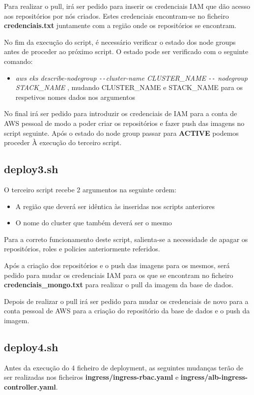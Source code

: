 \documentclass[11pt,a4paper]{article}
\begin{document}
Para realizar o pull, irá ser pedido para inserir os credenciais IAM que dão acesso aos repositórios por nós criados. Estes credenciais encontram-se no ficheiro \textbf{credenciais.txt} juntamente com a região onde os repositórios se encontram.

No fim da execução do script, é necessário verificar o estado dos node groups antes de proceder ao próximo script. O estado pode ser verificado com o seguinte comando: 
\begin{itemize}
	\item \textit{aws eks describe-nodegroup \texttt{-{}-}cluster-name CLUSTER\_NAME \texttt{-{}-} nodegroup STACK\_NAME} , mudando CLUSTER\_NAME e STACK\_NAME para os respetivos nomes dados nos argumentos
\end{itemize}
No final irá ser pedido para introduzir os credenciais de IAM para a conta de AWS pessoal de modo a poder criar os repositórios e fazer push das imagens no script seguinte.
Após o estado do node group passar para \textbf{ACTIVE} podemos proceder À execução do terceiro script.

\subsection{deploy3.sh}
O terceiro script recebe 2 argumentos na seguinte ordem:
\begin{itemize}
	\item A região que deverá ser idêntica às inseridas nos scripts anteriores
	\item O nome do cluster que também deverá ser o mesmo
\end{itemize}
Para a correto funcionamento deste script, salienta-se a necessidade de apagar os repositórios, roles e policies anteriormente referidos.

Após a criação dos repositórios e o push das imagens para os mesmos, será pedido para mudar os credenciais IAM para os que se encontram no ficheiro \textbf{credenciais\_mongo.txt} para realizar o pull da imagem da base de dados.

Depois de realizar o pull irá ser pedido para mudar os credenciais de novo para a conta pessoal de AWS para a criação do repositório da base de dados e o push da imagem.

\subsection{deploy4.sh}
Antes da execução do 4 ficheiro de deployment, as seguintes mudanças terão de ser realizadas nos ficheiros \textbf{ingress/ingress-rbac.yaml} e \textbf{ingress/alb-ingress-controller.yaml}.
\end{document}
